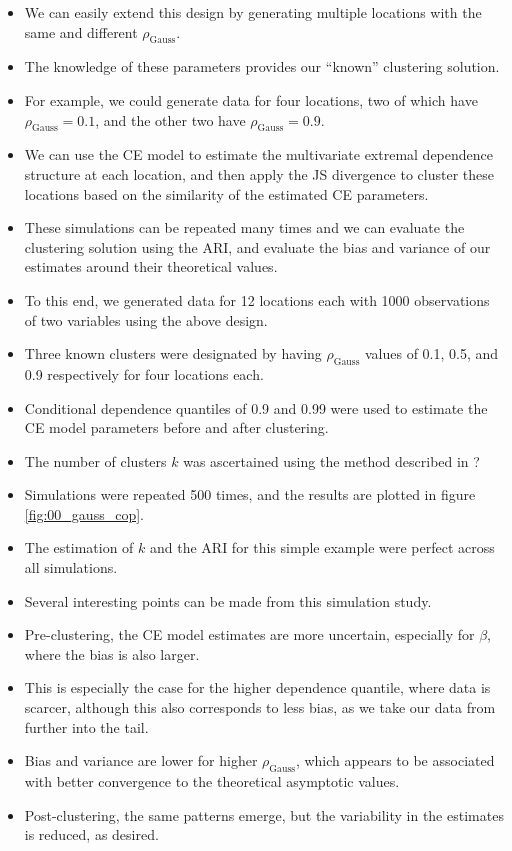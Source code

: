 \documentclass{article}
\numberwithin{equation}{section}
\begin{document}
\vspace{1cm}

\begin{itemize}
  \item We can easily extend this design by generating multiple locations with the same and different $\rho_{\text{Gauss}}$.
  \item The knowledge of these parameters provides our ``known'' clustering solution.
  \item For example, we could generate data for four locations, two of which have $\rho_{\text{Gauss}} = 0.1$, and the other two have $\rho_{\text{Gauss}} = 0.9$. 
  \item We can use the CE model to estimate the multivariate extremal dependence structure at each location, and then apply the JS divergence to cluster these locations based on the similarity of the estimated CE parameters. 
  \item These simulations can be repeated many times and we can evaluate the clustering solution using the ARI, and evaluate the bias and variance of our estimates around their theoretical values.
\end{itemize}

\begin{itemize}
  \item To this end, we generated data for 12 locations each with 1000 observations of two variables using the above design.
  \item Three known clusters were designated by having $\rho_{\text{Gauss}}$ values of 0.1, 0.5, and 0.9 respectively for four locations each.
  \item Conditional dependence quantiles of 0.9 and 0.99 were used to estimate the CE model parameters before and after clustering. 
  \item The number of clusters $k$ was ascertained using the method described in ? 
  \item Simulations were repeated 500 times, and the results are plotted in figure \ref{fig:00_gauss_cop}.
  \item The estimation of $k$ and the ARI for this simple example were perfect across all simulations.
  \item Several interesting points can be made from this simulation study.
  \item Pre-clustering, the CE model estimates are more uncertain, especially for $\beta$, where the bias is also larger.
  \item This is especially the case for the higher dependence quantile, where data is scarcer, although this also corresponds to less bias, as we take our data from further into the tail. 
  \item Bias and variance are lower for higher $\rho_{\text{Gauss}}$, which appears to be associated with better convergence to the theoretical asymptotic values.
  \item Post-clustering, the same patterns emerge, but the variability in the estimates is reduced, as desired. 
\end{itemize}
\end{document}

